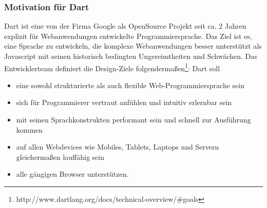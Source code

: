 \subsubsection{Motivation für Dart}
Dart ist eine von der Firma Google als OpenSource Projekt seit ca. 2 Jahren explizit für Webanwendungen entwickelte Programmiersprache. Das Ziel ist es, eine Sprache zu entwickeln, die komplexe Webanwendungen besser unterstützt als Javascript mit seinen historisch bedingten Ungereimtheiten und Schwächen.
Das Entwicklerteam definiert die Design-Ziele folgendermaßen\footnote{http://www.dartlang.org/docs/technical-overview/\#goals}:
Dart soll
\begin{itemize}   
\item eine sowohl strukturierte als auch flexible Web-Programmiersprache sein
\item sich für Programmierer vertraut anfühlen und intuitiv erlernbar sein 
\item mit seinen Sprachkonstrukten performant sein und schnell zur Ausführung kommen
\item auf allen Webdevices wie Mobiles, Tablets, Laptops und Servern gleichermaßen lauffähig sein
\item alle gängigen Browser unterstützen.
\end{itemize}

